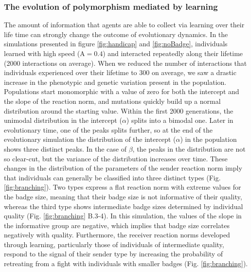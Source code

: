 \documentclass[
  12pt,
]{article}
\begin{document}
\hypertarget{the-evolution-of-polymorphism-mediated-by-learning}{%
\subsubsection{The evolution of polymorphism mediated by
learning}\label{the-evolution-of-polymorphism-mediated-by-learning}}

The amount of information that agents are able to collect via learning
over their life time can strongly change the outcome of evolutionary
dynamics. In the simulations presented in figure \ref{fig:handicap} and
\ref{fig:noBadge}, individuals learned with high speed
(\(\mathrm{A} = 0.4\)) and interacted repeatedly along their lifetime
(2000 interactions on average). When we reduced the number of
interactions that individuals experienced over their lifetime to 300 on
average, we saw a drastic increase in the phenotypic and genetic
variation present in the population. Populations start monomorphic with
a value of zero for both the intercept and the slope of the reaction
norm, and mutations quickly build up a normal distribution around the
starting value. Within the first 2000 generations, the unimodal
distribution in the intercept (\(\alpha\)) splits into a bimodal one.
Later in evolutionary time, one of the peaks splits further, so at the
end of the evolutionary simulation the distribution of the intercept
(\(\alpha\)) in the population shows three distinct peaks. In the case
of \(\beta\), the peaks in the distribution are not so clear-cut, but
the variance of the distribution increases over time. These changes in
the distribution of the parameters of the sender reaction norm imply
that individuals can generally be classified into three distinct types
(Fig. \ref{fig:branching}). Two types express a flat reaction norm with
extreme values for the badge size, meaning that their badge size is not
informative of their quality, whereas the third type shows intermediate
badge sizes determined by individual quality (Fig. \ref{fig:branching}
B.3-4). In this simulation, the values of the slope in the informative
group are negative, which implies that badge size correlates negatively
with quality. Furthermore, the receiver reaction norms developed through
learning, particularly those of individuals of intermediate quality,
respond to the signal of their sender type by increasing the probability
of retreating from a fight with individuals with smaller badges (Fig.
\ref{fig:branching}).
\end{document}
